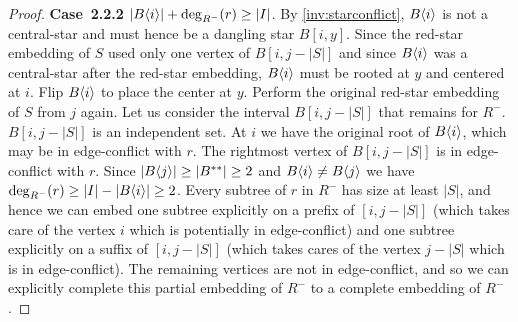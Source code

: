 \documentclass[11pt,a4paper,colorlinks=true,urlcolor=blue,citecolor=red]{article}
\theoremstyle{plain}
\newcommand{\case}[1]{\par\vspace{.5\baselineskip}\noindent\textbf{\sffamily Case~#1}}
\begin{document}
\begin{proof}
  \case{2.2.2} $|B\langle{i}\rangle|+\deg_{R^-}(r)\geq|I|$. By
  \ref{inv:starconflict}, $B\langle{i}\rangle$ is not a central-star and must
  hence be a dangling star $B[i,y]$. Since the red-star
  embedding of $S$ used only one vertex of $B[i,j-|S|]$ and since
  $B\langle{i}\rangle$ was a central-star after the red-star embedding,
  $B\langle{i}\rangle$ must be rooted at $y$ and centered at $i$. Flip
  $B\langle{i}\rangle$ to place the center at $y$. Perform the original
  red-star embedding of $S$ from $j$ again. Let us consider the
  interval $B[i,j-|S|]$ that remains for $R^-$. $B[i,j-|S|]$ is an
  independent set. At $i$ we have the original root of $B\langle{i}\rangle$,
  which may be in edge-conflict with $r$. The rightmost vertex of
  $B[i,j-|S|]$ is in edge-conflict with $r$. Since
  $|B\langle{j}\rangle|\geq|B^{**}|\geq2$ and $B\langle{i}\rangle\neq B\langle{j}\rangle$ we have
  $\deg_{R^-}(r)\geq|I|-|B\langle{i}\rangle|\geq2$. Every subtree of $r$ in
  $R^-$ has size at least $|S|$, and hence we can embed one subtree
  explicitly on a prefix of $[i,j-|S|]$ (which takes care of the vertex
  $i$ which is potentially in edge-conflict) and one subtree explicitly
  on a suffix of $[i,j-|S|]$ (which takes cares of the vertex $j-|S|$
  which is in edge-conflict). The remaining vertices are not
  in edge-conflict, and so we can explicitly complete this partial
  embedding of $R^-$ to a complete embedding of $R^-$.
\end{proof}
\end{document}

